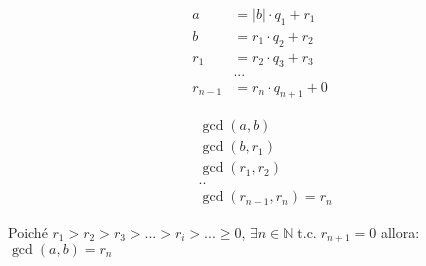 \begin{figure}[h]
    \centering
    \begin{minipage}[t]{0.45\textwidth}
        \centering
        \begin{align*}
            a &= |b| \cdot q_1 + r_1 \\
            b &= r_1 \cdot q_2 + r_2 \\
            r_1 &= r_2 \cdot q_3 + r_3 \\
            & ... \\
            r_{n - 1} &= r_n \cdot q_{n + 1} + 0
        \end{align*}
    \end{minipage}
    \begin{minipage}[t]{0.45\textwidth}
        \centering
        \begin{align*}
            & \gcd (a, b) \\
            & \gcd (b, r_1) \\
            & \gcd (r_1, r_2) \\
            & .. \\
            & \gcd (r_{n - 1}, r_n) = r_n
        \end{align*}
    \end{minipage}
\end{figure}
Poiché $r_1 > r_2 > r_3 > ... > r_i > ... \geq 0$, $\exists n \in \mathbb{N} \; \text{t.c.} \; r_{n + 1} = 0$ allora: $\gcd (a, b) = r_n$

